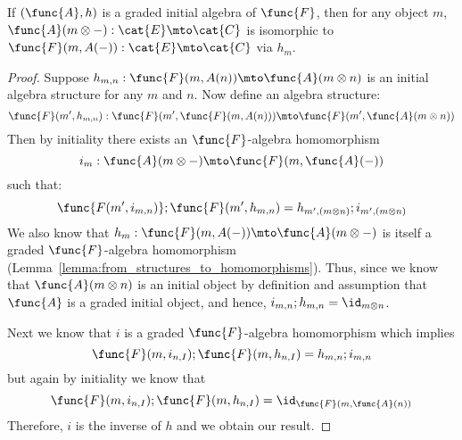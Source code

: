 \begin{lemma}
\label{lemma:graded_lambeks_lemma}
    If $(\func{A},h)$ is a graded initial algebra of $\func{F}$, 
    then for any object $m$, 
    $\func{A}(m \otimes -) : \cat{E} \mto \cat{C}$ is isomorphic to 
    $\func{F}(m, A(-)) : \cat{E} \mto \cat{C}$ via $h_m$.
\end{lemma}
\begin{proof}
    Suppose $h_{m,n} : \func{F}(m,A(n)) \mto \func{A}(m \otimes n)$ is an initial
    algebra structure for any $m$ and $n$.  
    Now define an algebra structure:
    \[
    \func{F}(m',h_{m,n}) : \func{F}(m',\func{F}(m,A(n))) \mto \func{F}(m',\func{A}(m \otimes n))
    \]
    Then by initiality there exists an $\func{F}$-algebra homomorphism 
    $$i_{m} : \func{A}(m \otimes -) \mto \func{F}(m,\func{A}(-))$$ such that:
    $$\func{F(m',i_{m,n})} ; \func{F}(m',h_{m,n}) = h_{m',(m \otimes n)} ;
    i_{m',(m \otimes n)}$$
    We also know that $h_{m} : \func{F}(m,A(-)) \mto \func{A}(m \otimes -)$ is
    itself a graded $\func{F}$-algebra homomorphism
    (Lemma~\ref{lemma:from_structures_to_homomorphisms}). Thus, since we
    know that $\func{A}(m \otimes n)$ is an initial object by definition and
    assumption that $\func{A}$ is a graded initial object, and hence, 
    $i_{m,n}; h_{m,n} = \id_{m \otimes n}$.  
    
    Next we know that $i$ is a graded $\func{F}$-algebra homomorphism which
    implies $$\func{F}(m,i_{n,I});\func{F}(m,h_{n,I}) =
    h_{m,n};i_{m,n}$$ but again by initiality we know that
    $$\func{F}(m,i_{n,I});\func{F}(m,h_{n,I}) =
    \id_{\func{F}(m,\func{A}(n))}$$
    Therefore, $i$ is the inverse of $h$ and we obtain our result.
\end{proof}


